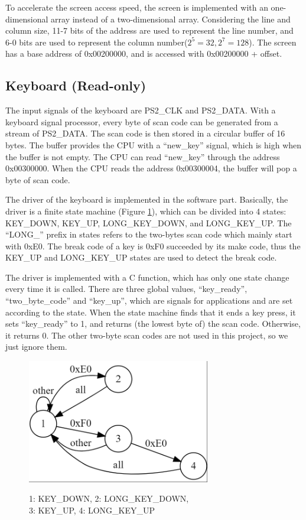 \documentclass[
	a4paper, %
	11pt, %
]{CSUniSchoolLabReport}
\begin{document}
To accelerate the screen access speed, the screen is implemented with an one-dimensional array instead of a two-dimensional array. Considering the line and column size, 11-7 bits of the address are used to represent the line number, and 6-0 bits are used to represent the column number($2^5=32,2^7=128$). The screen has a base address of 0x00200000, and is accessed with 0x00200000 + offset.
\subsection{Keyboard (Read-only)}
The input signals of the keyboard are PS2\_CLK and PS2\_DATA. With a keyboard signal processor, every byte of scan code can be generated from a stream of PS2\_DATA. The scan code is then stored in a circular buffer of 16 bytes. The buffer provides the CPU with a ``new\_key'' signal, which is high when the buffer is not empty. The CPU can read ``new\_key'' through the address 0x00300000. When the CPU reads the address 0x00300004, the buffer will pop a byte of scan code.

The driver of the keyboard is implemented in the software part. Basically, the driver is a finite state machine (Figure \ref{fig:image1}), which can be divided into 4 states: KEY\_DOWN, KEY\_UP, LONG\_KEY\_DOWN, and LONG\_KEY\_UP. The ``LONG\_'' prefix in states refers to the two-bytes scan code which mainly start with 0xE0. The break code of a key is 0xF0 succeeded by its make code, thus the KEY\_UP and LONG\_KEY\_UP states are used to detect the break code.

The driver is implemented with a C function, which has only one state change every time it is called. There are three global values, ``key\_ready'', ``two\_byte\_code'' and ``key\_up'', which are signals for applications and are set according to the state. When the state machine finds that it ends a key press, it sets ``key\_ready'' to 1, and returns (the lowest byte of) the scan code. Otherwise, it returns 0. The other two-byte scan codes are not used in this project, so we just ignore them.

\begin{figure}[!htb]
    \centering
    \includegraphics[width=8cm]{image1.png}
    \par 1: KEY\_DOWN, 2: LONG\_KEY\_DOWN, \\ 3: KEY\_UP, 4: LONG\_KEY\_UP
    \label{fig:image1}

\end{figure}
\end{document}

